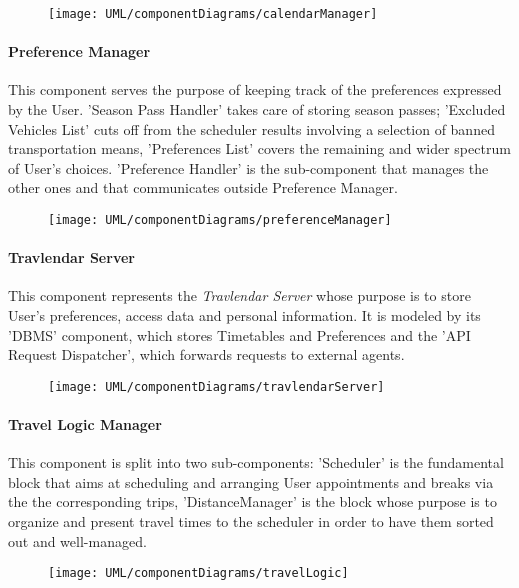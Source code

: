 		\begin{figure}[H]
			\centering
			\texttt{[image: UML/componentDiagrams/calendarManager]}
		\end{figure}
 

	\paragraph{Preference Manager}
		This component serves the purpose of keeping track of the preferences expressed by the User. 'Season Pass Handler' takes care of storing season passes; 'Excluded Vehicles List' cuts off from the scheduler results involving a selection of banned transportation means, 'Preferences List' covers the remaining and wider spectrum of User's choices. 'Preference Handler' is the sub-component that manages the other ones and that communicates outside Preference Manager.

		\begin{figure}[H]
			\centering
			\texttt{[image: UML/componentDiagrams/preferenceManager]}
		\end{figure}
	

	\paragraph{Travlendar Server} 
		This component represents the \textit{Travlendar Server} whose purpose is to store User's preferences, access data and personal information. It is modeled by its 'DBMS' component, which stores Timetables and Preferences and the 'API Request Dispatcher', which forwards requests to external agents.

		\begin{figure}[H]
			\centering
			\texttt{[image: UML/componentDiagrams/travlendarServer]}
		\end{figure}
	

	\paragraph{Travel Logic Manager}
		This component is split into two sub-components: 'Scheduler' is the fundamental block that aims at scheduling and arranging User appointments and breaks via the the corresponding trips, 'DistanceManager' is the block whose purpose is to organize and present travel times to the scheduler in order to have them sorted out and well-managed.

		\begin{figure}[H]
			\centering
			\texttt{[image: UML/componentDiagrams/travelLogic]}
		\end{figure}
	

